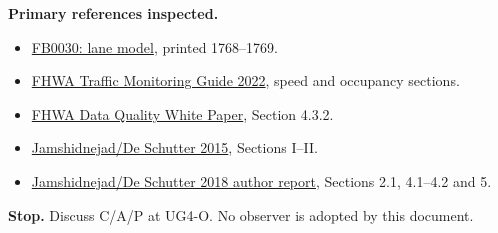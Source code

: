\documentclass[10pt,a4paper]{article}
\begin{document}
\textbf{Primary references inspected.}
\begin{itemize}
\item \href{https://repository.tudelft.nl/file/File_2c4359e7-5e5a-4651-964f-6f3610ab89ae}{FB0030: lane model}, printed 1768--1769.
\item \href{https://www.fhwa.dot.gov/policyinformation/tmguide/tmg_2022/traffic-data-collection.cfm}{FHWA Traffic Monitoring Guide 2022}, speed and occupancy sections.
\item \href{https://ops.fhwa.dot.gov/publications/fhwahop08038/04infoshare.htm}{FHWA Data Quality White Paper}, Section 4.3.2.
\item \href{https://www.dcsc.tudelft.nl/~bdeschutter/pub/rep/15_035.pdf}{Jamshidnejad/De Schutter 2015}, Sections I--II.
\item \href{https://www.dcsc.tudelft.nl/~bdeschutter/pub/rep/17_001.pdf}{Jamshidnejad/De Schutter 2018 author report}, Sections 2.1, 4.1--4.2 and 5.
\end{itemize}
\textbf{Stop.} Discuss C/A/P at UG4-O. No observer is adopted by this document.
\end{document}
